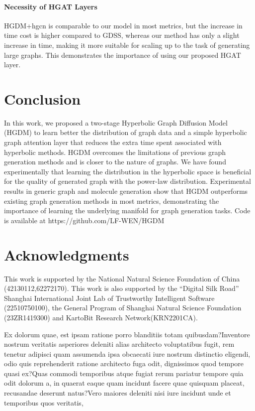 \documentclass[letterpaper]{article} %
\begin{document}
\paragraph{Necessity of HGAT Layers}
HGDM+hgcn is comparable to our model in most metrics, but the increase in time cost is higher compared to GDSS, whereas our method has only a slight increase in time, making it more suitable for scaling up to the task of generating large graphs.
This demonstrates the importance of using our proposed HGAT layer.
\section{Conclusion}

In this work, we proposed a two-stage Hyperbolic Graph Diffusion Model (HGDM) to learn better the distribution of graph data and a simple hyperbolic graph attention layer that reduces the extra time spent associated with hyperbolic methods.
HGDM overcomes the limitations of previous graph generation methods and is closer to the nature of graphs.
We have found experimentally that learning the distribution in the hyperbolic space is beneficial for the quality of generated graph with the power-law distribution.
Experimental results in generic graph and molecule generation show that
HGDM outperforms existing graph generation methods in most metrics, demonstrating the importance of learning the underlying manifold for graph generation tasks.
Code is available at https://github.com/LF-WEN/HGDM
\section*{Acknowledgments}
This work is supported by the National Natural Science Foundation of China (42130112,62272170). This work
is also supported by the ``Digital Silk Road'' Shanghai International Joint Lab of Trustworthy Intelligent Software (22510750100), the General Program of Shanghai Natural Science Foundation (23ZR1419300) and KartoBit Research Network(KRN2201CA).

\bigskip

\vspace{-2.82mm}
Ex dolorum quae, est ipsam ratione porro blanditiis totam quibusdam?Inventore nostrum veritatis asperiores deleniti alias architecto voluptatibus fugit, rem tenetur adipisci quam assumenda ipsa obcaecati iure nostrum distinctio eligendi, odio quis reprehenderit ratione architecto fuga odit, dignissimos quod tempore quasi ex?Quas commodi temporibus atque fugiat rerum pariatur tempore quia odit dolorum a, in quaerat eaque quam incidunt facere quae quisquam placeat, recusandae deserunt natus?Vero maiores deleniti nisi iure incidunt unde et temporibus quos veritatis,

\end{document}
